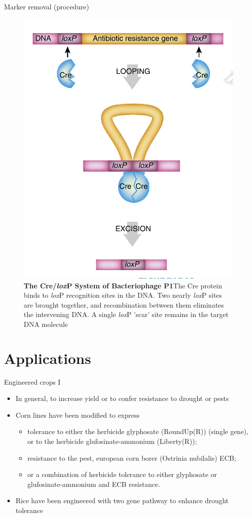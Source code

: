 \documentclass[ignorenonframetext,aspectratio=169]{beamer}
\providecommand{\tightlist}{%
  \setlength{\itemsep}{0pt}\setlength{\parskip}{0pt}}
\begin{document}
\begin{frame}{Marker removal (procedure)}
\protect\hypertarget{marker-removal-procedure}{}

\begin{figure}
\includegraphics[width=0.35\linewidth]{../images/marker_removal} \caption{\textbf{The Cre/\textit{lox}P System of Bacteriophage P1}\newline The Cre protein binds to \textit{lox}P recognition sites in the DNA. Two nearly \textit{lox}P sites are brought together, and recombination between them eliminates the intervening DNA. A single \textit{lox}P 'scar' site remains in the target DNA molecule}\label{fig:marker-removal}
\end{figure}

\end{frame}

\hypertarget{applications}{%
\section{Applications}\label{applications}}

\begin{frame}{Engineered crops I}
\protect\hypertarget{engineered-crops-i}{}

\begin{itemize}
\tightlist
\item
  In general, to increase yield or to confer resistance to drought or
  pests
\item
  Corn lines have been modified to express

  \begin{itemize}
  \tightlist
  \item
    tolerance to either the herbicide glyphosate (RoundUp(R)) (single
    gene), or to the herbicide glufosinate-ammonium (Liberty(R));
  \item
    resistance to the pest, european corn borer (Ostrinia nubilalis)
    ECB;
  \item
    or a combination of herbicide tolerance to either glyphosate or
    glufosinate-ammonium and ECB resistance.
  \end{itemize}
\item
  Rice have been engineered with two gene pathway to enhance drought
  tolerance
\end{itemize}

\end{frame}
\end{document}
